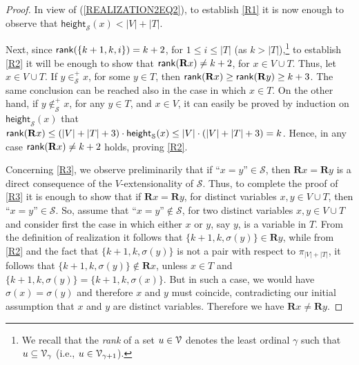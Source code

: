 \documentclass[a4paper,UKenglish]{lipics}
\newcommand{\atset}{\mathcal{S}}
\newcommand{\vheight}{\mathsf{height}_{\atset}}
\newcommand{\memclosure}[1]{\in_{#1}^{+}}
\newcommand{\aslit}[1]{\mbox{``}#1\mbox{''}}
\newcommand{\real}{\mathbf{R}}
\begin{document}
\begin{proof}
In view of (\ref{REALIZATION2EQ2}), to establish \ref{R1} it is now
enough to observe that $\vheight(x) < |V|+|T|$.

\smallskip

Next, since $\mathsf{rank}(\{k+1, k, i\}) = k+2$, for $1 \leq i \leq |T|$ (as
$k > |T|$),\footnote{We recall that the \emph{rank} of a set $u \in
\mathcal{V}$ denotes the least ordinal $\gamma$ such that $u \subseteq
\mathcal{V}_{\gamma}$ (i.e., $u \in \mathcal{V}_{\gamma+1}$).} to establish \ref{R2}
it will be enough to show that $\rank(\real x) \neq k+2$, for $x \in V
\cup T$.  Thus, let $x \in V \cup T$.  If $y \memclosure{\atset} x$,
for some $y \in T$, then $\rank(\real x) \geq \rank(\real y) \geq k+3$.
The same conclusion can be reached also in the case in which $x \in
T$.  On the other hand, if $y \not\memclosure{\atset} x$, for any $y
\in T$, and $x \in V$, it can easily be proved by induction on
$\vheight(x)$ that $\rank(\real x) \leq (|V| + |T| + 3)\cdot \vheight(x)
\leq |V|\cdot (|V| + |T|+3) = k$.  Hence, in any case $\rank(\real x)
\neq k+2$ holds, proving \ref{R2}.

\smallskip

Concerning \ref{R3}, we observe preliminarily that if $\aslit{x=y} \in
\atset$, then $\real x = \real y$ is a direct consequence of the
$V$-extensionality of $\atset$.  Thus, to complete the proof of
\ref{R3} it is enough to show that if $\real x = \real y$, for
distinct variables $x,y \in V \cup T$, then $\aslit{x=y} \in \atset$.
So, assume that $\aslit{x=y} \notin \atset$, for two distinct
variables $x,y \in V \cup T$ and consider first the case in which
either $x$ or $y$, say $y$, is a variable in $T$.  From the definition
of realization it follows that $\{k+1,k,\sigma(y)\} \in \real y$,
while from \ref{R2} and the fact that $\{k+1,k,\sigma(y)\}$ is not a
pair with respect to $\pi_{|V|+|T|}$, it follows that
$\{k+1,k,\sigma(y)\} \notin \real x$, unless $x \in T$ and
$\{k+1,k,\sigma(y)\} = \{k+1,k,\sigma(x)\}$.  But in such a case, we
would have $\sigma(x) = \sigma(y)$ and therefore $x$ and $y$ must
coincide, contradicting our initial assumption that $x$ and $y$ are
distinct variables. Therefore we have $\real x \neq \real y$.


\end{proof}
\end{document}
